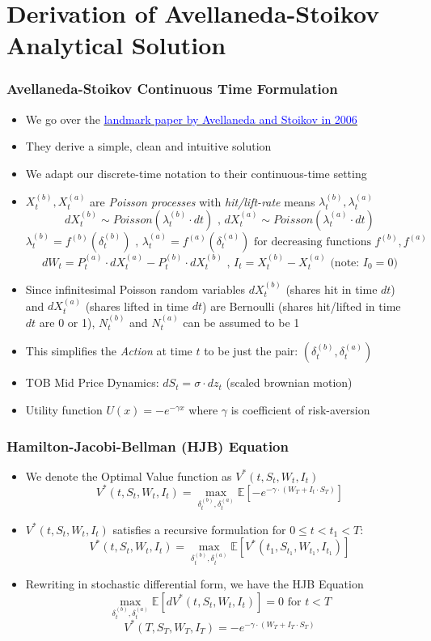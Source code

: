 \documentclass[handout]{beamer}
\begin{document}
\section{Derivation of Avellaneda-Stoikov Analytical Solution}
\begin{frame}
\frametitle{Avellaneda-Stoikov Continuous Time Formulation}
\pause
\begin{itemize}[<+->]
\item We go over the \href{https://www.math.nyu.edu/faculty/avellane/HighFrequencyTrading.pdf}{\underline{\textcolor{blue}{landmark paper by Avellaneda and Stoikov in 2006}}}
\item They derive a simple, clean and intuitive solution
\item We adapt our discrete-time notation to their continuous-time setting
\item $X_t^{(b)}, X_t^{(a)}$ are {\em Poisson processes} with {\em hit/lift-rate} means $\lambda_t^{(b)}, \lambda_t^{(a)}$
$$dX_t^{(b)} \sim Poisson(\lambda_t^{(b)} \cdot dt) \mbox{ , } dX_t^{(a)} \sim Poisson(\lambda_t^{(a)} \cdot dt)$$
$$\lambda_t^{(b)} = f^{(b)}(\delta_t^{(b)}) \mbox{ , } \lambda_t^{(a)} = f^{(a)}(\delta_t^{(a)}) \mbox{ for decreasing functions } f^{(b)}, f^{(a)}$$
$$dW_t = P_t^{(a)} \cdot dX_t^{(a)} - P_t^{(b)} \cdot dX_t^{(b)} \mbox{ , } I_t = X_t^{(b)} - X_t^{(a)} \mbox{ (note: } I_0 = 0 \mbox{)}$$
\item Since infinitesimal Poisson random variables $dX_t^{(b)}$ (shares hit in time $dt$) and $dX_t^{(a)}$ (shares lifted in time $dt$) are Bernoulli (shares hit/lifted in time $dt$ are 0 or 1), $N_t^{(b)}$ and $N_t^{(a)}$ can be assumed to be 1
\item This simplifies the {\em Action} at time $t$ to be just the pair: $(\delta_t^{(b)}, \delta_t^{(a)})$
\item TOB Mid Price Dynamics: $dS_t = \sigma \cdot dz_t$ (scaled brownian motion)
\item Utility function $U(x) = -e^{-\gamma x}$ where $\gamma$ is coefficient of risk-aversion  
\end{itemize}
\end{frame}

\begin{frame}
\frametitle{Hamilton-Jacobi-Bellman (HJB) Equation}
\pause
\begin{itemize}[<+->]
\item We denote the Optimal Value function as $V^*(t, S_t, W_t, I_t)$
$$V^*(t, S_t, W_t, I_t) = \max_{\delta_t^{(b)}, \delta_t^{(a)}} \mathbb{E}[-e^{-\gamma \cdot (W_T + I_t \cdot S_T)}]$$
\item $V^*(t, S_t, W_t, I_t)$ satisfies a recursive formulation for $0 \leq t < t_1 < T$:
$$V^*(t, S_t, W_t, I_t) = \max_{\delta_t^{(b)}, \delta_t^{(a)}} \mathbb{E}[V^*(t_1, S_{t_1}, W_{t_1}, I_{t_1})]$$
\item Rewriting in stochastic differential form, we have the HJB Equation
$$\max_{\delta_t^{(b)}, \delta_t^{(a)}} \mathbb{E}[dV^*(t, S_t, W_t, I_t)] = 0 \mbox{ for } t < T$$
$$V^*(T, S_T, W_T, I_T) = -e^{-\gamma \cdot (W_T + I_T \cdot S_T)}$$
\end{itemize}
\end{frame}
\end{document}
